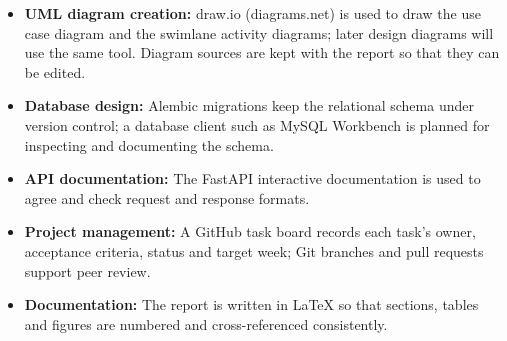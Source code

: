 \begin{itemize}
  \item \textbf{UML diagram creation:} draw.io (diagrams.net) is used to draw the use case diagram and the swimlane activity diagrams; later design diagrams will use the same tool. Diagram sources are kept with the report so that they can be edited.
  \item \textbf{Database design:} Alembic migrations keep the relational schema under version control; a database client such as MySQL Workbench is planned for inspecting and documenting the schema.
  \item \textbf{API documentation:} The FastAPI interactive documentation is used to agree and check request and response formats.
  \item \textbf{Project management:} A GitHub task board records each task's owner, acceptance criteria, status and target week; Git branches and pull requests support peer review.
  \item \textbf{Documentation:} The report is written in \LaTeX{} so that sections, tables and figures are numbered and cross-referenced consistently.
\end{itemize}
